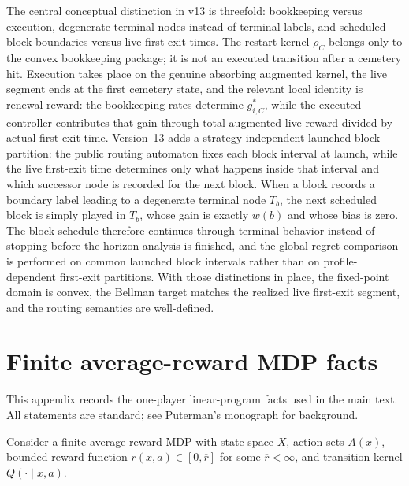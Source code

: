 \documentclass[12pt]{article}
\theoremstyle{definition}
\newcommand{\1}{\mathbf{1}}
\begin{document}
The central conceptual distinction in v13 is threefold: bookkeeping versus
execution, degenerate terminal nodes instead of terminal labels, and scheduled
block boundaries versus live first-exit times. The restart kernel $\rho_C$
belongs only to the convex bookkeeping package; it is not an executed transition
after a cemetery hit. Execution takes place on the genuine absorbing augmented
kernel, the live segment ends at the first cemetery state, and the relevant
local identity is renewal-reward: the bookkeeping rates determine $g_{i,C}^*$,
while the executed controller contributes that gain through total augmented live
reward divided by actual first-exit time. Version~13 adds a strategy-independent
launched block partition: the public routing automaton fixes each block interval
at launch, while the live first-exit time determines only what happens inside
that interval and which successor node is recorded for the next block. When a
block records a boundary label leading to a degenerate terminal node $T_b$, the
next scheduled block is simply played in $T_b$, whose gain is exactly $w(b)$ and
whose bias is zero. The block schedule therefore continues through terminal
behavior instead of stopping before the horizon analysis is finished, and the
global regret comparison is performed on common launched block intervals rather
than on profile-dependent first-exit partitions. With those distinctions in
place, the fixed-point domain is convex, the Bellman target matches the realized
live first-exit segment, and the routing semantics are well-defined.

\appendix

\section{Finite average-reward MDP facts}
\label{app:mdp}

This appendix records the one-player linear-program facts used in the main text.
All statements are standard; see Puterman's monograph \cite{Puterman1994} for
background.

Consider a finite average-reward MDP with state space $X$, action sets $A(x)$,
bounded reward function $r(x,a)\in[0,\overline r]$ for some $\overline r<\infty$,
and transition kernel $Q(\cdot\mid x,a)$.
\end{document}
